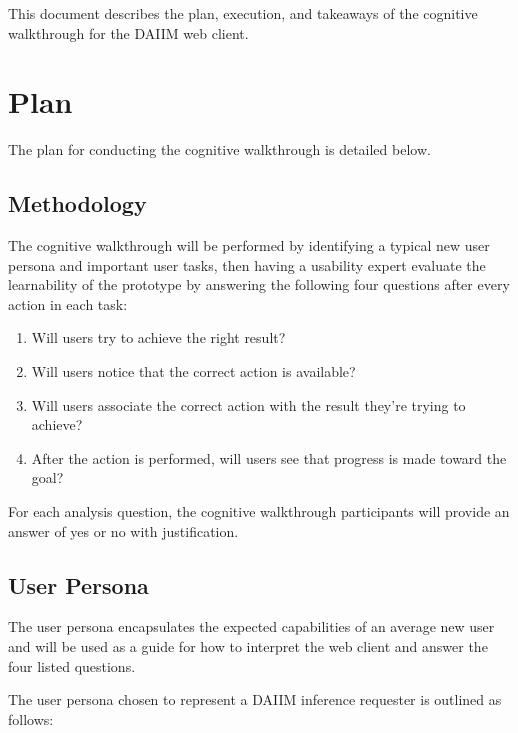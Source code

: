 \documentclass{article}
\begin{document}
This document describes the plan, execution, and takeaways of the cognitive walkthrough for the 
DAIIM web client.


\section{Plan}
The plan for conducting the cognitive walkthrough is detailed below.


\subsection{Methodology}
The cognitive walkthrough will be performed by identifying a typical new user persona and important 
user tasks, then having a usability expert evaluate the learnability of the prototype by answering the 
following four questions after every action in each task:

\begin{enumerate}
    \item Will users try to achieve the right result?
    \item Will users notice that the correct action is available? 
    \item Will users associate the correct action with the result they're trying to achieve?
    \item After the action is performed, will users see that progress is made toward the goal?
\end{enumerate}

For each analysis question, the cognitive walkthrough participants will provide an answer of yes or no with justification.

\subsection{User Persona}
The user persona encapsulates the expected capabilities of an average new user and 
will be used as a guide for how to interpret the web client and answer the four listed questions.

The user persona chosen to represent a DAIIM inference requester is outlined as follows:
\end{document}
